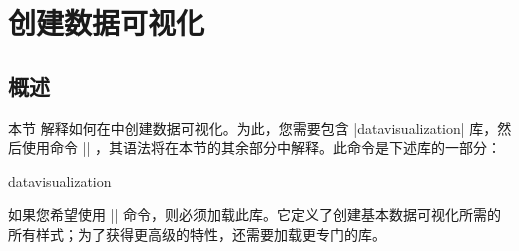 %
%
%


\section{创建数据可视化}
\label{section-dv-main}
\label{section-dv-main-setup}

\subsection{概述}


本节  解释如何在\tikzname 中创建数据可视化。为此，您需要包含 |datavisualization| 库，然后使用命令 |\datavisualization| ，其语法将在本节的其余部分中解释。此命令是下述库的一部分：

\begin{tikzlibrary}{datavisualization}

    如果您希望使用 |\datavisualization| 命令，则必须加载此库。它定义了创建基本数据可视化所需的所有样式；为了获得更高级的特性，还需要加载更专门的库。
\end{tikzlibrary}


